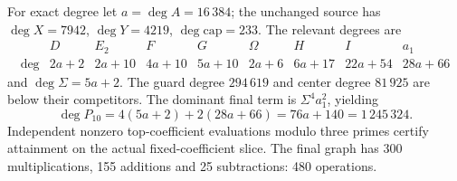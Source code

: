 For exact degree let $a=\deg A=16\,384$; the unchanged source has
$\deg X=7942$, $\deg Y=4219$, $\deg\mathrm{cap}=233$.
The relevant degrees are
\[
\begin{array}{c|rrrrrrrr}
& D&E_2&F&G&\Omega&H&I&a_1\\\hline
\deg&2a+2&2a+10&4a+10&5a+10&2a+6&6a+17&22a+54&28a+66
\end{array}
\]
and $\deg\Sigma=5a+2$. The guard degree $294\,619$ and center degree
$81\,925$ are below their competitors. The dominant final term is
$\Sigma^4a_1^2$, yielding
\[
 \deg P_{10}=4(5a+2)+2(28a+66)=76a+140=1\,245\,324.
\]
Independent nonzero top-coefficient evaluations modulo three primes
certify attainment on the actual fixed-coefficient slice. The final graph
has 300 multiplications, 155 additions and 25 subtractions: 480 operations.
